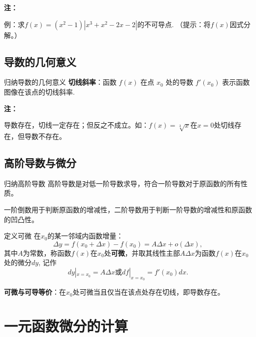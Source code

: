 \documentclass[a4paper,12pt,oneside,fontset=none]{ctexbook}
\newenvironment{induction}[1][]{\begin{thmBox}{归纳}{#1}}{\end{thmBox}}
\newcounter{definition}[chapter]
\newenvironment{definition}[1][]{\begin{defBox}{定义}{#1}}{\end{defBox}}
\newenvironment{note}{
    \par\vspace{0.5em}\noindent
    \textbf{\color{NoteColor} 注：}
}{
    \par\vspace{0.5em}
}
\numberwithin{equation}{chapter}
\begin{document}
\begin{note}
例：求$f(x)=(x^2-1)|x^3+x^2-2x-2|$的不可导点.
（提示：将$f(x)$因式分解。）
\end{note}


\section{导数的几何意义}

\begin{induction}[导数的几何意义]
\textbf{切线斜率}：函数 $f(x)$ 在点 $x_0$ 处的导数 $f'(x_0)$ 表示函数图像在该点的切线斜率.
\end{induction}
\begin{note}
导数存在，切线一定存在；但反之不成立。如：$f(x) = \sqrt[3]{x}$在$x=0$处切线存在，但导数不存在。
\end{note}


\section{高阶导数与微分}

\begin{induction}[高阶导数]
高阶导数是对低一阶导数求导，符合一阶导数对于原函数的所有性质。

一阶倒数用于判断原函数的增减性，二阶导数用于判断一阶导数的增减性和原函数的凹凸性。
\end{induction}

\begin{definition}[可微]
在$x_0$的某一邻域内函数增量：
\[
    \Delta y = f(x_0 + \Delta x) - f(x_0) = A \Delta x + o(\Delta x), 
\]
其中$A$为常数，称函数$f(x)$在$x_0$处\textbf{可微}，并取其线性主部$A\Delta x$为函数$f(x)$在$x_0$处的微分$dy$,
记作
\[dy|_{x=x_0}=A\Delta x\text{或}df|_{x=x_0}=f'(x_0)dx.\]

\textbf{可微与可导等价}：在$x_0$处可微当且仅当在该点处存在切线，即导数存在。

\end{definition}



\chapter{一元函数微分的计算}
\end{document}

